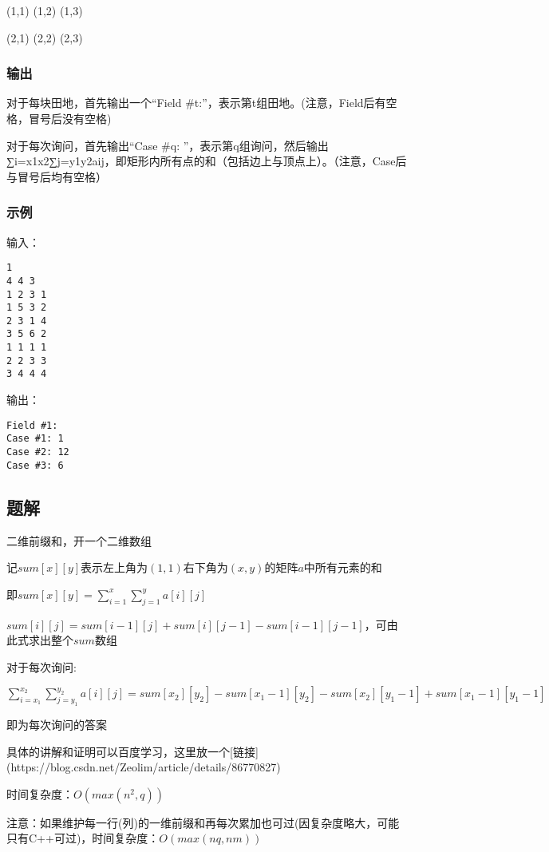 (1,1) (1,2) (1,3)

(2,1) (2,2) (2,3)

\subsubsection{输出}
对于每块田地，首先输出一个“Field #t:”，表示第t组田地。(注意，Field后有空格，冒号后没有空格)

对于每次询问，首先输出“Case #q: ”，表示第q组询问，然后输出∑i=x1x2∑j=y1y2aij，即矩形内所有点的和（包括边上与顶点上）。（注意，Case后与冒号后均有空格）

\subsubsection{示例}
输入：
\begin{lstlisting}
1
4 4 3
1 2 3 1
1 5 3 2
2 3 1 4
3 5 6 2
1 1 1 1
2 2 3 3
3 4 4 4
\end{lstlisting}

输出：
\begin{lstlisting}
Field #1:
Case #1: 1
Case #2: 12
Case #3: 6
\end{lstlisting}

\subsection{题解}
二维前缀和，开一个二维数组

记$sum[x][y]$表示左上角为$(1, 1)$右下角为$(x, y)$的矩阵$a$中所有元素的和

即$sum[x][y] = \sum\limits_{i = 1}^{x}\sum\limits_{j = 1}^{y}{a[i][j]}$

$sum[i][j] = sum[i - 1][j] + sum[i][j - 1] - sum[i - 1][j - 1]$，可由此式求出整个$sum$数组

对于每次询问:

$\sum\limits_{i = x_1}^{x_2}\sum\limits_{j = y_1}^{y_2}{a[i][j]} = sum[x_2][y_2] - sum[x_1 - 1][y_2] - sum[x_2][y_1 - 1] + sum[x_1 - 1][y_1 - 1]$

即为每次询问的答案

具体的讲解和证明可以百度学习，这里放一个[链接](https://blog.csdn.net/Zeolim/article/details/86770827)

时间复杂度：$O(max(n^2, q))$

注意：如果维护每一行(列)的一维前缀和再每次累加也可过(因复杂度略大，可能只有C++可过)，时间复杂度：$O(max(nq, nm))$

